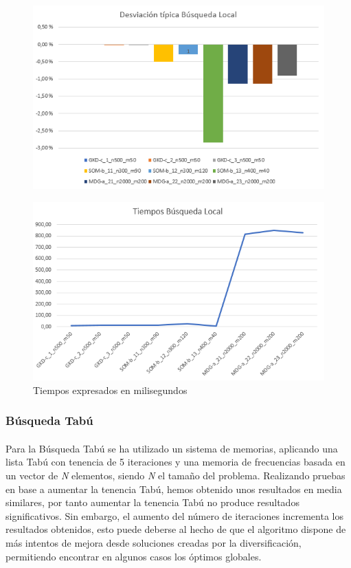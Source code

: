 \documentclass{article}
\begin{document}
	
	\begin{figure}[H]
		
		\centering
		\includegraphics[scale=0.4]{img/DTBlocal}
		
	\end{figure}
	
	\begin{figure}[H]
		
		\centering
		\includegraphics[scale=0.4]{img/TiemposBlocal}
		\caption{Tiempos expresados en milisegundos}
		
	\end{figure}
	
	\subsubsection{Búsqueda Tabú}
	
	\paragraph{}Para la Búsqueda Tabú se ha utilizado un sistema de memorias, aplicando una lista Tabú con tenencia de 5 iteraciones y una memoria de frecuencias basada en un vector de \emph{N} elementos, siendo \emph{N} el tamaño del problema. Realizando pruebas en base a aumentar la tenencia Tabú, hemos obtenido unos resultados en media similares, por tanto aumentar la tenencia Tabú no produce resultados significativos. Sin embargo, el aumento del número de iteraciones incrementa los resultados obtenidos, esto puede deberse al hecho de que el algoritmo dispone de más intentos de mejora desde soluciones creadas por la diversificación, permitiendo encontrar en algunos casos los óptimos globales.
	
\end{document}
